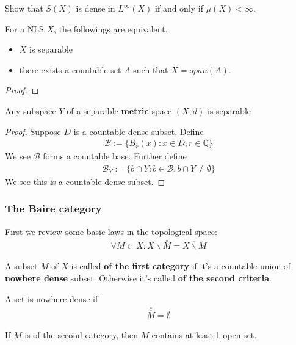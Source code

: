\begin{example}
Show that $S(X)$ is dense in $L^\infty(X)$ if and only if $\mu(X) < \infty$.	
\end{example}

\begin{lemma}
	For a NLS $X$, the followings are equivalent.
	\begin{itemize}
		\item $X$ is separable
		\item there exists a countable set $A$ such that $X = \overline{span(A)}$.
	\end{itemize}
\end{lemma}
\begin{proof}
	
\end{proof}


\begin{proposition}
Any subspace $Y$ of a separable \textbf{metric }space $(X, d)$ is separable
\end{proposition}
\begin{proof}
	Suppose $D$ is a countable dense subset. Define
	\begin{align*}
		\mathcal{B}:= \{ B_r(x): x \in D, r \in \mathbb{Q} \}
	\end{align*}
	We see $\mathcal{B}$ forms a countable base. Further define
	\begin{align*}
		\mathcal{B}_Y:= \{ b \cap Y: b \in \mathcal{B}, b \cap Y \neq \emptyset \}
	\end{align*}
	We see this is a countable dense subset.
\end{proof}


\subsubsection{The Baire category}
First we review some basic laws in the topological space:
\begin{align*}
	\forall M \subset X: X \backslash \overset{\circ}{M} = \overline{ X \backslash M}
\end{align*}
\begin{definition}
	A subset $M$ of $X$ is called \textbf{of the first category} if it's a countable union of \textbf{nowhere dense} subset. Otherwise it's called \textbf{of the second criteria}.\par 
	A set is nowhere dense if 
	\begin{align*}
		\overset{\circ}{\overline{M}} = \emptyset 
	\end{align*}
\end{definition}
\begin{remark}
If $M$ is of the second category, then $M$ contains at least 1 open set. 	
\end{remark}

